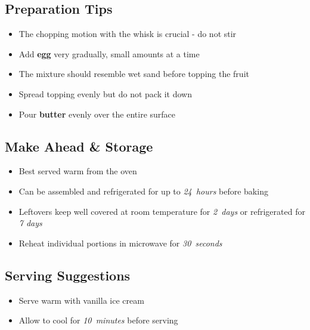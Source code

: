 \documentclass[11pt,letterpaper]{article}
\begin{document}
{\begin{multicols}{2}
\subsection*{Preparation Tips}
\begin{itemize}
    \item The chopping motion with the whisk is crucial - do not stir
    \item Add \textbf{egg} very gradually, small amounts at a time
    \item The mixture should resemble wet sand before topping the fruit
    \item Spread topping evenly but do not pack it down
    \item Pour \textbf{butter} evenly over the entire surface
\end{itemize}

\subsection*{Make Ahead \& Storage}
\begin{itemize}
    \item Best served warm from the oven
    \item Can be assembled and refrigerated for up to \textit{24~hours} before baking
    \item Leftovers keep well covered at room temperature for \textit{2~days} or refrigerated for \textit{7 days}
    \item Reheat individual portions in microwave for \textit{30~seconds}
\end{itemize}

\subsection*{Serving Suggestions}
\begin{itemize}
    \item Serve warm with vanilla ice cream
    \item Allow to cool for \textit{10~minutes} before serving
\end{itemize}

\end{multicols}
}
\end{document}

